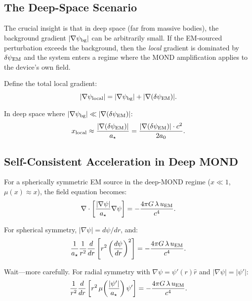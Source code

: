 \documentclass[aps,prd,twocolumn,superscriptaddress,nofootinbib]{revtex4-2}
\newcommand{\astar}{a_\star}
\newcommand{\lam}{\lambda}
\begin{document}
\subsection{The Deep-Space Scenario}

The crucial insight is that in deep space (far from massive bodies),
the background gradient $|\nabla\psi_{\rm bg}|$ can be arbitrarily
small.  If the EM-sourced perturbation exceeds the background, then
the \emph{local} gradient is dominated by $\delta\psi_{\rm EM}$ and
the system enters a regime where the MOND amplification applies to
the device's own field.

Define the total local gradient:
\begin{equation}
|\nabla\psi_{\rm local}| = |\nabla\psi_{\rm bg}| + |\nabla(\delta\psi_{\rm EM})|.
\end{equation}

In deep space where $|\nabla\psi_{\rm bg}| \ll |\nabla(\delta\psi_{\rm EM})|$:
\begin{equation}
x_{\rm local} \approx \frac{|\nabla(\delta\psi_{\rm EM})|}{\astar}
= \frac{|\nabla(\delta\psi_{\rm EM})| \cdot c^2}{2a_0}.
\end{equation}

\subsection{Self-Consistent Acceleration in Deep MOND}

For a spherically symmetric EM source in the deep-MOND regime
($x \ll 1$, $\mu(x) \approx x$), the field equation becomes:
\begin{equation}
\nabla\cdot\left[\frac{|\nabla\psi|}{\astar}\nabla\psi\right]
= -\frac{4\pi G\,\lam\,u_{\rm EM}}{c^4}.
\end{equation}

For spherical symmetry, $|\nabla\psi| = d\psi/dr$, and:
\begin{equation}
\frac{1}{\astar}\frac{1}{r^2}\frac{d}{dr}\left[r^2\left(\frac{d\psi}{dr}\right)^2\right]
= -\frac{4\pi G\,\lam\,u_{\rm EM}}{c^4}.
\end{equation}

Wait---more carefully.  For radial symmetry with $\nabla\psi = \psi'(r)\hat{r}$
and $|\nabla\psi| = |\psi'|$:
\begin{equation}
\frac{1}{r^2}\frac{d}{dr}\left[r^2\,\mu\!\left(\frac{|\psi'|}{\astar}\right)\psi'\right]
= -\frac{4\pi G\,\lam\,u_{\rm EM}}{c^4}.
\end{equation}
\end{document}
